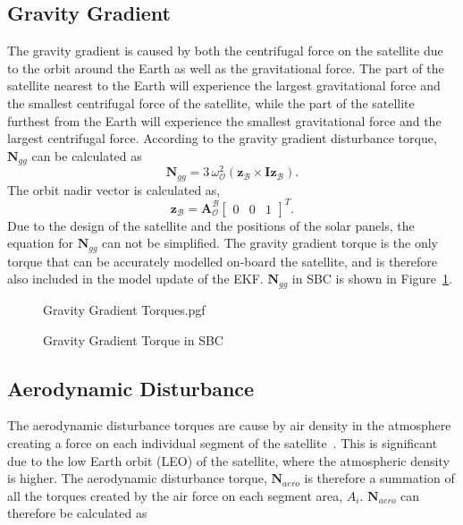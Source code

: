 \subsection{Gravity Gradient}
The gravity gradient is caused by both the centrifugal force on the satellite due to the orbit around the Earth as well as the gravitational force. The part of the satellite nearest to the Earth will experience the largest gravitational force and the smallest centrifugal force of the satellite, while the part of the satellite furthest from the Earth will experience the smallest gravitational force and the largest centrifugal force. According to \cite{wertz2012spacecraft} the gravity gradient disturbance torque, $\mathbf{N}_{gg}$ can be calculated as 
\begin{equation}
\boldsymbol{N}_{gg} = 3 \, \omega_\mathcal{O}^2 (\mathbf{z}_{\mathcal{B}} \times \mathbf{Iz}_{\mathcal{B}}).
\end{equation}
The orbit nadir vector is calculated as,
\begin{equation}
\mathbf{z}_{\mathcal{B}} = \boldsymbol{A}^{\mathcal{B}}_{\mathcal{O}} \begin{bmatrix} 0 & 0 & 1 \end{bmatrix}^T.
\end{equation}
Due to the design of the satellite and the positions of the solar panels, the equation for $\mathbf{N}_{gg}$ can not be simplified. The gravity gradient torque is the only torque that can be accurately modelled on-board the satellite, and is therefore also included in the model update of the EKF. $\mathbf{N}_{gg}$ in SBC is shown in Figure~\ref{fig:GravityGradientTorques}.

\begin{figure}[!htb]
	\centering
	\def\pgfwidth{10cm}
	{Gravity Gradient Torques.pgf}
	
	\caption{Gravity Gradient Torque in SBC}
	\label{fig:GravityGradientTorques}
\end{figure}

\subsection{Aerodynamic Disturbance}
The aerodynamic disturbance torques are cause by air density in the atmosphere creating a force on each individual segment of the satellite~\cite{Steyn2014}. This is significant due to the low Earth orbit (LEO) of the satellite, where the atmospheric density is higher. The aerodynamic disturbance torque, $\mathbf{N}_{aero}$ is therefore a summation of all the torques created by the air force on each segment area, $A_i$. $\mathbf{N}_{aero}$ can therefore be calculated as

